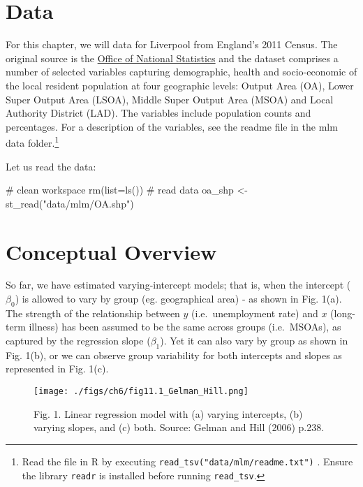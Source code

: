 \documentclass[
  letterpaper,
  krantz2]{style/krantz}
\newenvironment{Shaded}{\begin{snugshade}}{\end{snugshade}}
\newcommand{\AttributeTok}[1]{\textcolor[rgb]{0.40,0.45,0.13}{#1}}
\newcommand{\CommentTok}[1]{\textcolor[rgb]{0.37,0.37,0.37}{#1}}
\newcommand{\FunctionTok}[1]{\textcolor[rgb]{0.28,0.35,0.67}{#1}}
\newcommand{\NormalTok}[1]{\textcolor[rgb]{0.00,0.23,0.31}{#1}}
\newcommand{\OtherTok}[1]{\textcolor[rgb]{0.00,0.23,0.31}{#1}}
\newcommand{\StringTok}[1]{\textcolor[rgb]{0.13,0.47,0.30}{#1}}
\begin{document}
\hypertarget{data-4}{%
\section{Data}\label{data-4}}

For this chapter, we will data for Liverpool from England's 2011 Census.
The original source is the
\href{https://www.nomisweb.co.uk/home/census2001.asp}{Office of National
Statistics} and the dataset comprises a number of selected variables
capturing demographic, health and socio-economic of the local resident
population at four geographic levels: Output Area (OA), Lower Super
Output Area (LSOA), Middle Super Output Area (MSOA) and Local Authority
District (LAD). The variables include population counts and percentages.
For a description of the variables, see the readme file in the mlm data
folder.\footnote{Read the file in R by executing
  \texttt{read\_tsv("data/mlm/readme.txt")} . Ensure the library
  \texttt{readr} is installed before running \texttt{read\_tsv}.}

Let us read the data:

\begin{Shaded}
\begin{Highlighting}[]
\CommentTok{\# clean workspace}
\FunctionTok{rm}\NormalTok{(}\AttributeTok{list=}\FunctionTok{ls}\NormalTok{())}
\CommentTok{\# read data}
\NormalTok{oa\_shp }\OtherTok{\textless{}{-}} \FunctionTok{st\_read}\NormalTok{(}\StringTok{"data/mlm/OA.shp"}\NormalTok{)}
\end{Highlighting}
\end{Shaded}

\hypertarget{conceptual-overview}{%
\section{Conceptual Overview}\label{conceptual-overview}}

So far, we have estimated varying-intercept models; that is, when the
intercept (\(\beta_{0}\)) is allowed to vary by group (eg. geographical
area) - as shown in Fig. 1(a). The strength of the relationship between
\(y\) (i.e.~unemployment rate) and \(x\) (long-term illness) has been
assumed to be the same across groups (i.e.~MSOAs), as captured by the
regression slope (\(\beta_{1}\)). Yet it can also vary by group as shown
in Fig. 1(b), or we can observe group variability for both intercepts
and slopes as represented in Fig. 1(c).

\begin{figure}

{\centering \texttt{[image: ./figs/ch6/fig11.1\_Gelman\_Hill.png]}

}

\caption{Fig. 1. Linear regression model with (a) varying intercepts,
(b) varying slopes, and (c) both. Source: Gelman and Hill (2006) p.238.}

\end{figure}
\end{document}
